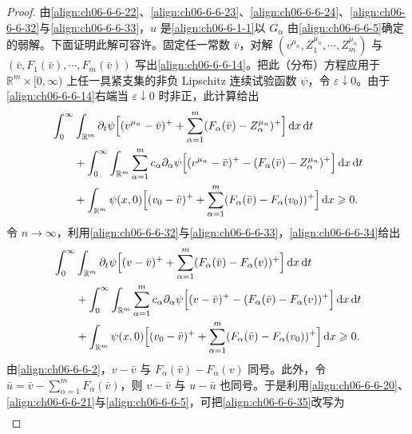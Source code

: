 \documentclass[../../main.tex]{subfiles}
\begin{document}
\begin{proof}
由\eqref{align:ch06-6-6-22}、\eqref{align:ch06-6-6-23}、\eqref{align:ch06-6-6-24}、\eqref{align:ch06-6-6-32}与\eqref{align:ch06-6-6-33}，$u$ 是\eqref{align:ch06-6-1-1}以 $G_{\alpha}$ 由\eqref{align:ch06-6-6-5}确定的弱解。下面证明此解可容许。固定任一常数 $\bar{v}$，对解 $(v^{\mu_{n}},Z_{1}^{\mu_{n}},\cdots,Z_{m}^{\mu_{n}})$ 与 $(\bar{v},F_{1}(\bar{v}),\cdots,F_{m}(\bar{v}))$ 写出\eqref{align:ch06-6-6-14}。把此（分布）方程应用于 $\mathbb{R}^{m}\times[0,\infty)$ 上任一具紧支集的非负 Lipschitz 连续试验函数 $\psi$，令 $\varepsilon\downarrow 0$。由于\eqref{align:ch06-6-6-14}右端当 $\varepsilon\downarrow 0$ 时非正，此计算给出
\begin{align}
&\int_{0}^{\infty}\int_{\mathbb{R}^{m}}\partial_{t}\psi\Bigl{[}(v^{\mu_{n}}-\bar{v})^{+}+\sum_{\alpha=1}^{m}(F_{\alpha}(\bar{v})-Z_{\alpha}^{\mu_{n}})^{+}\Bigr{]}\,\mathrm{d}x\,\mathrm{d}t\notag\\
&\qquad+\int_{0}^{\infty}\int_{\mathbb{R}^{m}}\sum_{\alpha=1}^{m}c_{\alpha}\partial_{\alpha}\psi\Bigl{[}(v^{\mu_{n}}-\bar{v})^{+}-(F_{\alpha}(\bar{v})-Z_{\alpha}^{\mu_{n}})^{+}\Bigr{]}\,\mathrm{d}x\,\mathrm{d}t\notag\\
&\qquad+\int_{\mathbb{R}^{m}}\psi(x,0)\Bigl{[}(v_{0}-\bar{v})^{+}+\sum_{\alpha=1}^{m}(F_{\alpha}(\bar{v})-F_{\alpha}(v_{0}))^{+}\Bigr{]}\,\mathrm{d}x\geqslant 0.
\label{align:ch06-6-6-34}
\end{align}
令 $n\to\infty$，利用\eqref{align:ch06-6-6-32}与\eqref{align:ch06-6-6-33}，\eqref{align:ch06-6-6-34}给出
\begin{align}
&\int_{0}^{\infty}\int_{\mathbb{R}^{m}}\partial_{t}\psi\Bigl{[}(v-\bar{v})^{+}+\sum_{\alpha=1}^{m}(F_{\alpha}(\bar{v})-F_{\alpha}(v))^{+}\Bigr{]}\,\mathrm{d}x\,\mathrm{d}t\notag\\
&\qquad+\int_{0}^{\infty}\int_{\mathbb{R}^{m}}\sum_{\alpha=1}^{m}c_{\alpha}\partial_{\alpha}\psi\Bigl{[}(v-\bar{v})^{+}-(F_{\alpha}(\bar{v})-F_{\alpha}(v))^{+}\Bigr{]}\,\mathrm{d}x\,\mathrm{d}t\notag\\
&\qquad+\int_{\mathbb{R}^{m}}\psi(x,0)\Bigl{[}(v_{0}-\bar{v})^{+}+\sum_{\alpha=1}^{m}(F_{\alpha}(\bar{v})-F_{\alpha}(v_{0}))^{+}\Bigr{]}\,\mathrm{d}x\geqslant 0.
\label{align:ch06-6-6-35}
\end{align}
由\eqref{align:ch06-6-6-2}，$v-\bar{v}$ 与 $F_{\alpha}(\bar{v})-F_{\alpha}(v)$ 同号。此外，令 $\bar{u}=\bar{v}-\sum_{\alpha=1}^{m}F_{\alpha}(\bar{v})$，则 $v-\bar{v}$ 与 $u-\bar{u}$ 也同号。于是利用\eqref{align:ch06-6-6-20}、\eqref{align:ch06-6-6-21}与\eqref{align:ch06-6-6-5}，可把\eqref{align:ch06-6-6-35}改写为
\begin{align}

\end{align}
\end{proof}
\end{document}
